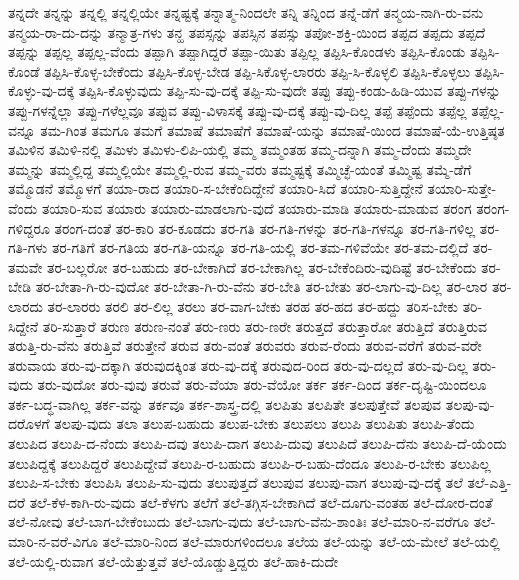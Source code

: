 {ತನ್ನದೇ
ತನ್ನನ್ನು
ತನ್ನಲ್ಲಿ
ತನ್ನಲ್ಲಿಯೇ
ತನ್ನಷ್ಟಕ್ಕೆ
ತನ್ನಾತ್ಮ-ನಿಂದಲೇ
ತನ್ನಿ
ತನ್ನಿಂದ
ತನ್ನೆ-ಡೆಗೆ
ತನ್ಮಯ-ನಾಗಿ-ರು-ವನು
ತನ್ಮಯ-ರಾ-ದು-ದನ್ನು
ತನ್ಮಾತ್ರ-ಗಳು
ತನ್ಹ
ತಪಸ್ಸನ್ನು
ತಪಸ್ಸಿನ
ತಪಸ್ಸು
ತಪೋ-ಶಕ್ತಿ-ಯಿಂದ
ತಪ್ಪದ
ತಪ್ಪದು
ತಪ್ಪದೆ
ತಪ್ಪನ್ನು
ತಪ್ಪಲ್ಲ
ತಪ್ಪಲ್ಲ-ವೆಂದು
ತಪ್ಪಾಗಿ
ತಪ್ಪಾಗಿದ್ದರೆ
ತಪ್ಪಾ-ಯಿತು
ತಪ್ಪಿಲ್ಲ
ತಪ್ಪಿಸಿ-ಕೊಂಡಳು
ತಪ್ಪಿಸಿ-ಕೊಂಡು
ತಪ್ಪಿಸಿ-ಕೊಂಡೆ
ತಪ್ಪಿಸಿ-ಕೊಳ್ಳ-ಬೇಕೆಂದು
ತಪ್ಪಿಸಿ-ಕೊಳ್ಳ-ಬೇಡ
ತಪ್ಪಿ-ಸಿಕೊಳ್ಳ-ಲಾರರು
ತಪ್ಪಿ-ಸಿ-ಕೊಳ್ಳಲಿ
ತಪ್ಪಿಸಿ-ಕೊಳ್ಳಲು
ತಪ್ಪಿಸಿ-ಕೊಳ್ಳು-ವು-ದಕ್ಕೆ
ತಪ್ಪಿಸಿ-ಕೊಳ್ಳುವುದು
ತಪ್ಪಿ-ಸು-ವು-ದಕ್ಕೆ
ತಪ್ಪಿ-ಸು-ವುದೇ
ತಪ್ಪು
ತಪ್ಪು-ಕಂಡು-ಹಿಡಿ-ಯುವ
ತಪ್ಪು-ಗಳನ್ನು
ತಪ್ಪು-ಗಳನ್ನೆಲ್ಲಾ
ತಪ್ಪು-ಗಳೆಲ್ಲವೂ
ತಪ್ಪುವ
ತಪ್ಪು-ವಿಳಾಸಕ್ಕೆ
ತಪ್ಪು-ವು-ದಕ್ಕೆ
ತಪ್ಪು-ವು-ದಿಲ್ಲ
ತಪ್ಪೆ
ತಪ್ಪೆಂದು
ತಪ್ಪೆಲ್ಲ
ತಪ್ಪೆಲ್ಲ-ವನ್ನೂ
ತಮ-ಗಿಂತ
ತಮಗೂ
ತಮಗೆ
ತಮಾಷೆ
ತಮಾಷೆಗೆ
ತಮಾಷೆ-ಯನ್ನು
ತಮಾಷೆ-ಯಿಂದ
ತಮಾಷೆ-ಯೆ-ಉತ್ತಿಷ್ಠತ
ತಮಿಳಿನ
ತಮಿಳಿ-ನಲ್ಲಿ
ತಮಿಳು
ತಮಿಳು-ಲಿಪಿ-ಯಲ್ಲಿ
ತಮ್ಮ
ತಮ್ಮಂತಹ
ತಮ್ಮ-ದನ್ನಾಗಿ
ತಮ್ಮ-ದೆಂದು
ತಮ್ಮದೇ
ತಮ್ಮನ್ನು
ತಮ್ಮಲ್ಲಿದ್ದ
ತಮ್ಮಲ್ಲಿಯೇ
ತಮ್ಮಲ್ಲಿ-ರುವ
ತಮ್ಮ-ವರು
ತಮ್ಮಷ್ಟಕ್ಕೆ
ತಮ್ಮಿಚ್ಛೆ-ಯಂತೆ
ತಮ್ಮಿಷ್ಟ
ತಮ್ಮೆ-ಡೆಗೆ
ತಮ್ಮೊಡನೆ
ತಮ್ಮೊಳಗೆ
ತಯಾ-ರಾದ
ತಯಾರಿ-ಸ-ಬೇಕೆಂದಿದ್ದೇನೆ
ತಯಾರಿ-ಸಿದೆ
ತಯಾರಿ-ಸುತ್ತಿದ್ದೇನೆ
ತಯಾರಿ-ಸುತ್ತೇ-ವೆಂದು
ತಯಾರಿ-ಸುವ
ತಯಾರು
ತಯಾರು-ಮಾಡಲಾಗು-ವುದೆ
ತಯಾರು-ಮಾಡಿ
ತಯಾರು-ಮಾಡುವ
ತರಂಗ
ತರಂಗ-ಗಳಿದ್ದರೂ
ತರಂಗ-ದಂತೆ
ತರ-ಕಾರಿ
ತರ-ಕೂಡದು
ತರ-ಗತಿ
ತರ-ಗತಿ-ಗಳನ್ನು
ತರ-ಗತಿ-ಗಳನ್ನೂ
ತರ-ಗತಿ-ಗಳಿಲ್ಲ
ತರ-ಗತಿ-ಗಳು
ತರ-ಗತಿಗೆ
ತರ-ಗತಿಯ
ತರ-ಗತಿ-ಯನ್ನೂ
ತರ-ಗತಿ-ಯಲ್ಲಿ
ತರ-ತಮ-ಗಳಿವೆಯೇ
ತರ-ತಮ-ದಲ್ಲಿದೆ
ತರ-ತಮವೇ
ತರ-ಬಲ್ಲರೋ
ತರ-ಬಹುದು
ತರ-ಬೇಕಾಗಿದೆ
ತರ-ಬೇಕಾಗಿಲ್ಲ
ತರ-ಬೇಕೆಂದಿರು-ವುದಿಷ್ಟೆ
ತರ-ಬೇಕೆಂದು
ತರ-ಬೇಡಿ
ತರ-ಬೇತಾ-ಗಿ-ರು-ವುದೋ
ತರ-ಬೇತಾ-ಗಿ-ರು-ವೆನು
ತರ-ಬೇತಿ
ತರ-ಬೇತು
ತರ-ಲಾಗು-ವು-ದಿಲ್ಲ
ತರ-ಲಾರ
ತರ-ಲಾರದು
ತರ-ಲಾರರು
ತರಲಿ
ತರ-ಲಿಲ್ಲ
ತರಲು
ತರ-ವಾಗ-ಬೇಕು
ತರಹ
ತರ-ಹದ
ತರ-ಹದ್ದು
ತರಿಸ-ಬೇಕು
ತರಿ-ಸಿದ್ದೇನೆ
ತರಿ-ಸುತ್ತಾರೆ
ತರುಣ
ತರುಣ-ನಂತೆ
ತರು-ಣರು
ತರು-ಣರೇ
ತರುತ್ತದೆ
ತರುತ್ತಾರೋ
ತರುತ್ತಿದೆ
ತರುತ್ತಿರುವ
ತರುತ್ತಿ-ರು-ವೆನು
ತರುತ್ತಿವೆ
ತರುತ್ತೇನೆ
ತರುವ
ತರು-ವಂತೆ
ತರುವರು
ತರುವ-ರೆಂದು
ತರುವ-ವರೆಗೆ
ತರುವ-ವರೇ
ತರುವಾಯ
ತರು-ವು-ದಕ್ಕಾಗಿ
ತರುವುದಕ್ಕಿಂತ
ತರು-ವು-ದಕ್ಕೆ
ತರುವುದ-ರಿಂದ
ತರು-ವು-ದಲ್ಲದೆ
ತರು-ವು-ದಿಲ್ಲ
ತರು-ವುದು
ತರು-ವುದೋ
ತರು-ವುವು
ತರುವೆ
ತರು-ವೆಯಾ
ತರು-ವೆಯೋ
ತರ್ಕ
ತರ್ಕ-ದಿಂದ
ತರ್ಕ-ದೃಷ್ಟಿ-ಯಿಂದಲೂ
ತರ್ಕ-ಬದ್ಧ-ವಾಗಿಲ್ಲ
ತರ್ಕ-ವನ್ನು
ತರ್ಕವೂ
ತರ್ಕ-ಶಾಸ್ತ್ರ-ದಲ್ಲಿ
ತಲಪಿತು
ತಲಪಿತೇ
ತಲಪುತ್ತೇವೆ
ತಲಪುವ
ತಲಪು-ವು-ದರೊಳಗೆ
ತಲಪು-ವುದು
ತಲಾ
ತಲುಪ-ಬಹುದು
ತಲುಪ-ಬೇಕು
ತಲುಪಲು
ತಲುಪಿ
ತಲುಪಿತು
ತಲುಪಿ-ತೆಂದು
ತಲುಪಿದ
ತಲುಪಿ-ದ-ನೆಂದು
ತಲುಪಿ-ದವು
ತಲುಪಿ-ದಾಗ
ತಲುಪಿ-ದುವು
ತಲುಪಿದೆ
ತಲುಪಿ-ದೆನು
ತಲುಪಿ-ದೆ-ಯೆಂದು
ತಲುಪಿದ್ದಕ್ಕೆ
ತಲುಪಿದ್ದರೆ
ತಲುಪಿದ್ದೇವೆ
ತಲುಪಿ-ರ-ಬಹುದು
ತಲುಪಿ-ರ-ಬಹು-ದೆಂದೂ
ತಲುಪಿ-ರ-ಬೇಕು
ತಲುಪಿಲ್ಲ
ತಲುಪಿ-ಸ-ಬೇಕು
ತಲುಪಿಸಿ
ತಲುಪಿ-ಸು-ವುದು
ತಲುಪುತ್ತದೆ
ತಲುಪುವ
ತಲುಪು-ವಾಗ
ತಲುಪು-ವು-ದಕ್ಕೆ
ತಲೆ
ತಲೆ-ಎತ್ತಿ-ದರೆ
ತಲೆ-ಕೆಳ-ಕಾಗಿ-ರು-ವುದು
ತಲೆ-ಕೆಳಗು
ತಲೆಗೆ
ತಲೆ-ತಗ್ಗಿಸ-ಬೇಕಾಗಿದೆ
ತಲೆ-ದೂಗು-ವಂತಹ
ತಲೆ-ದೋರ-ದಂತೆ
ತಲೆ-ನೋವು
ತಲೆ-ಬಾಗ-ಬೇಕೆಂಬುದು
ತಲೆ-ಬಾಗು-ವುದು
ತಲೆ-ಬಾಗು-ವೆನು-ಶಾಂತಿಃ
ತಲೆ-ಮಾರಿ-ನ-ವರೆಗೂ
ತಲೆ-ಮಾರಿ-ನ-ವರೆ-ವಿಗೂ
ತಲೆ-ಮಾರಿ-ನಿಂದ
ತಲೆ-ಮಾರುಗಳಿಂದಲೂ
ತಲೆಯ
ತಲೆ-ಯನ್ನು
ತಲೆ-ಯ-ಮೇಲೆ
ತಲೆ-ಯಲ್ಲಿ
ತಲೆ-ಯಲ್ಲಿ-ರುವಾಗ
ತಲೆ-ಯೆತ್ತುತ್ತವೆ
ತಲೆ-ಯೊಡ್ಡುತ್ತಿದ್ದರು
ತಲೆ-ಹಾಕಿ-ದುದೇ
}
